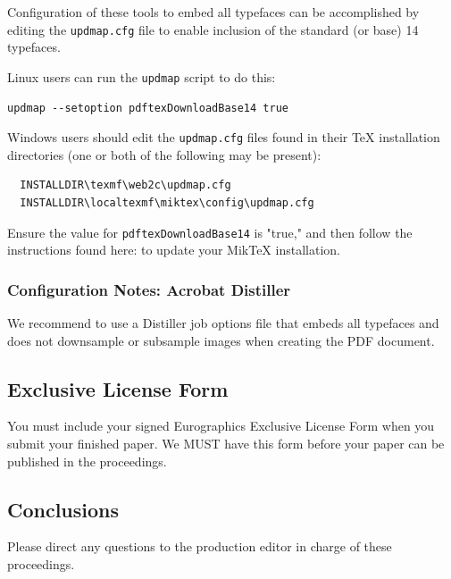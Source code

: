 \documentclass{egpubl}
\begin{document}
\noindent
Configuration of these tools to embed all typefaces can be accomplished by editing the \texttt{updmap.cfg} file
to enable inclusion of the standard (or base) 14 typefaces.

Linux users can run the \texttt{updmap} script to do this:
\begin{verbatim}
updmap --setoption pdftexDownloadBase14 true
\end{verbatim}

Windows users should edit the \texttt{updmap.cfg} files found in their TeX installation directories (one or both
of the following may be present):
\begin{verbatim}
  INSTALLDIR\texmf\web2c\updmap.cfg
  INSTALLDIR\localtexmf\miktex\config\updmap.cfg
\end{verbatim}

Ensure the value for \texttt{pdftexDownloadBase14} is "true," and then follow the instructions found here:
 to update your MikTeX installation.

\subsubsection*{Configuration Notes: Acrobat Distiller}

We recommend to use a Distiller job options file that embeds
all typefaces and does not downsample or subsample images when creating the PDF document.
\subsection{Exclusive License Form}

You must include your signed Eurographics Exclusive License Form 
when you submit your finished paper. We MUST have this form before
your paper can be published in the proceedings.

\subsection{Conclusions}

Please direct any questions to the production editor in charge of
these proceedings.

\end{document}
